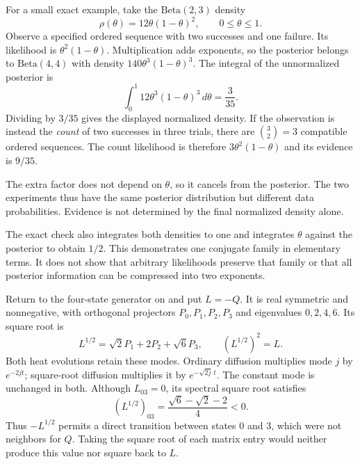 For a small exact example, take the $\mathrm{Beta}(2,3)$ density
\[
\rho(\theta)=12\theta(1-\theta)^2,\qquad0\le\theta\le1.
\]
Observe a specified ordered sequence with two successes and one failure. Its likelihood is $\theta^2(1-\theta)$. Multiplication adds exponents, so the posterior belongs to $\mathrm{Beta}(4,4)$ with density $140\theta^3(1-\theta)^3$.
The integral of the unnormalized posterior is
\[
\int_0^1 12\theta^3(1-\theta)^3\,d\theta=\frac3{35}.
\]
Dividing by $3/35$ gives the displayed normalized density. If the observation is instead the \emph{count} of two successes in three trials, there are $\binom32=3$ compatible ordered sequences. The count likelihood is therefore $3\theta^2(1-\theta)$ and its evidence is $9/35$.

The extra factor does not depend on $\theta$, so it cancels from the posterior. The two experiments thus have the same posterior distribution but different data probabilities. Evidence is not determined by the final normalized density alone.

The exact check also integrates both densities to one and integrates $\theta$ against the posterior to obtain $1/2$. This demonstrates one conjugate family in elementary terms. It does not show that arbitrary likelihoods preserve that family or that all posterior information can be compressed into two exponents.

Return to the four-state generator on  and put $L=-Q$. It is real symmetric and nonnegative, with orthogonal projectors $P_0,P_1,P_2,P_3$ and eigenvalues $0,2,4,6$. Its square root is
\[
L^{1/2}=\sqrt2P_1+2P_2+\sqrt6P_3,
\qquad (L^{1/2})^2=L.
\]
Both heat evolutions retain these modes. Ordinary diffusion multiplies mode $j$ by $e^{-2jt}$; square-root diffusion multiplies it by $e^{-\sqrt{2j}\,t}$. The constant mode is unchanged in both.
Although $L_{03}=0$, its spectral square root satisfies
\[
(L^{1/2})_{03}=\frac{\sqrt6-\sqrt2-2}{4}<0.
\]
Thus $-L^{1/2}$ permits a direct transition between states $0$ and $3$, which were not neighbors for $Q$. Taking the square root of each matrix entry would neither produce this value nor square back to $L$.

